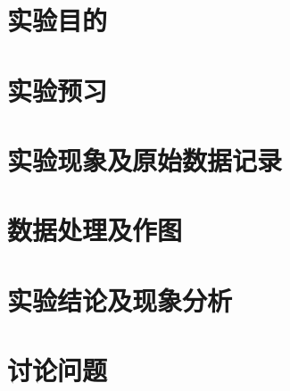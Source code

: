\documentclass[signature=data]{physicsreport}
\begin{document}
\maketitle

\section{实验目的}
\section{实验预习}


\makeatletter
{}
\makeatother


\section{实验现象及原始数据记录}


\makeatletter
{}
\makeatother

\newpage
\section{数据处理及作图}


\section{实验结论及现象分析}


\section{讨论问题}
\end{document}
